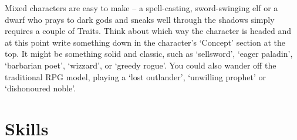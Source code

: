 \begin{multicols}{2}
{{    Mixed characters are easy to make -- a spell-casting, sword-swinging elf or a dwarf who prays to dark gods and sneaks well through the shadows simply requires a couple of Traits.
    Think about which way the character is headed and at this point write something down in the character's `Concept' section at the top.
    It might be something solid and classic, such as `sellsword', `eager paladin', `barbarian poet', `wizzard', or `greedy rogue'.
    You could also wander off the traditional RPG model, playing a `lost outlander', `unwilling prophet' or `dishonoured noble'.
  }

}{}

\end{multicols}

\section{Skills}


